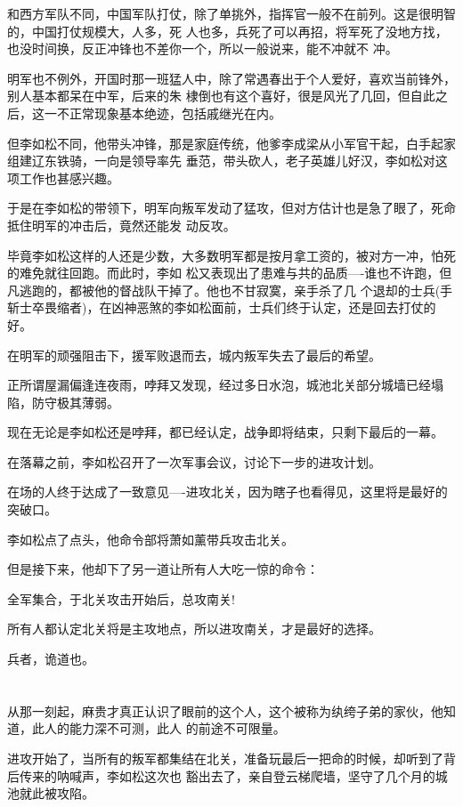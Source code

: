 \documentclass[11pt,a4paper,onecolumn]{article}
\begin{document}
和西方军队不同，中国军队打仗，除了单挑外，指挥官一般不在前列。这是很明智的，中国打仗规模大，人多，死
人也多，兵死了可以再招，将军死了没地方找，也没时间换，反正冲锋也不差你一个，所以一般说来，能不冲就不
冲。

明军也不例外，开国时那一班猛人中，除了常遇春出于个人爱好，喜欢当前锋外，别人基本都呆在中军，后来的朱
棣倒也有这个喜好，很是风光了几回，但自此之后，这一不正常现象基本绝迹，包括戚继光在内。

但李如松不同，他带头冲锋，那是家庭传统，他爹李成梁从小军官干起，白手起家组建辽东铁骑，一向是领导率先
垂范，带头砍人，老子英雄儿好汉，李如松对这项工作也甚感兴趣。

于是在李如松的带领下，明军向叛军发动了猛攻，但对方估计也是急了眼了，死命抵住明军的冲击后，竟然还能发
动反攻。

毕竟李如松这样的人还是少数，大多数明军都是按月拿工资的，被对方一冲，怕死的难免就往回跑。而此时，李如
松又表现出了患难与共的品质----谁也不许跑，但凡逃跑的，都被他的督战队干掉了。他也不甘寂寞，亲手杀了几
个退却的士兵(手斩士卒畏缩者)，在凶神恶煞的李如松面前，士兵们终于认定，还是回去打仗的好。

在明军的顽强阻击下，援军败退而去，城内叛军失去了最后的希望。

正所谓屋漏偏逢连夜雨，哱拜又发现，经过多日水泡，城池北关部分城墙已经塌陷，防守极其薄弱。

现在无论是李如松还是哱拜，都已经认定，战争即将结束，只剩下最后的一幕。

在落幕之前，李如松召开了一次军事会议，讨论下一步的进攻计划。

在场的人终于达成了一致意见----进攻北关，因为瞎子也看得见，这里将是最好的突破口。

李如松点了点头，他命令部将萧如薰带兵攻击北关。

但是接下来，他却下了另一道让所有人大吃一惊的命令：

全军集合，于北关攻击开始后，总攻南关!

所有人都认定北关将是主攻地点，所以进攻南关，才是最好的选择。

兵者，诡道也。

\section[\thesection]{}

从那一刻起，麻贵才真正认识了眼前的这个人，这个被称为纨绔子弟的家伙，他知道，此人的能力深不可测，此人
的前途不可限量。

进攻开始了，当所有的叛军都集结在北关，准备玩最后一把命的时候，却听到了背后传来的呐喊声，李如松这次也
豁出去了，亲自登云梯爬墙，坚守了几个月的城池就此被攻陷。
\end{document}
